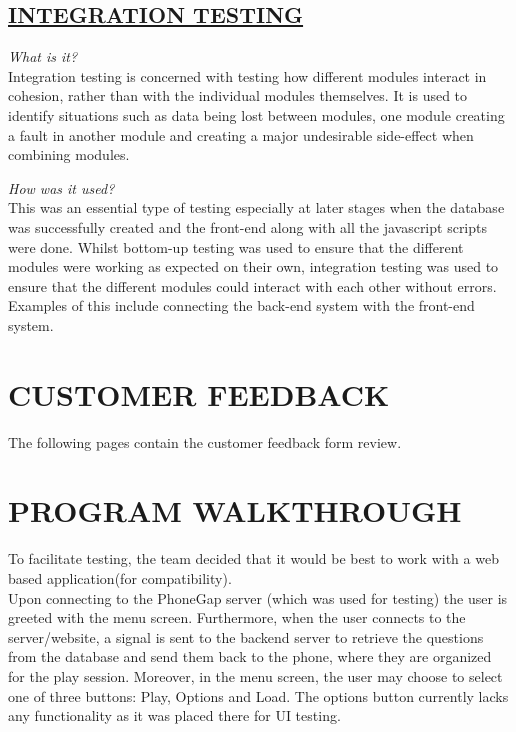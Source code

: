 \documentclass[paper=a4,fontsize=11pt]{article}
\newcommand{\sepspace}{\vspace*{1em}}		%
\newcommand{\sephalfspace}{\vspace*{0.3em}}		%
\newcommand{\MainSection}[1]{\section*{\uppercase{#1}}}
\newcommand{\SectionPart}[1]{\subsection*{\uppercase{#1}}}
\begin{document}
\SectionPart{\ul{Integration Testing}}
\textit{What is it?}\\
Integration testing is concerned with testing how different modules interact in cohesion, rather than with
the individual modules themselves. It is used to identify situations such as data being lost between modules,
one module creating a fault in another module and creating a major undesirable side-effect when combining modules.\\
\sephalfspace

\noindent
\textit{How was it used?}\\
This was an essential type of testing especially at later stages when the database was successfully
created and the front-end along with all the javascript scripts were done. Whilst bottom-up testing was used to ensure
that the different modules were working as expected on their own, integration testing was used to ensure that the different modules could 
interact with each other without errors. Examples of this include connecting the back-end system with the front-end system.\\

\sepspace

\MainSection{Customer Feedback}
The following pages contain the customer feedback form review.




\newpage


\MainSection{Program Walkthrough}
To facilitate testing, the team decided that it would be best to work with a
web based application(for compatibility).\\

\noindent
Upon connecting to the PhoneGap server (which was used for testing) the user is
greeted with the menu screen. Furthermore, when the user connects to the server/website,
a signal is sent to the backend server to retrieve the questions from the database
and send them back to the phone, where they are organized for the play session.
Moreover, in the menu screen, the user may choose to select one of three
buttons: Play, Options and Load. The options button currently lacks any functionality
as it was placed there for UI testing.\\
\end{document}

